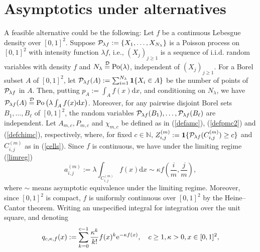 \documentclass[12pt]{article}
\def\N{\mathbb{N}}
\newcommand{\edist}{\stackrel{\mbox{\scriptsize${\cal D}$}}{=}}
\begin{document}





\section{Asymptotics under alternatives}\label{sec:alternativ}
A feasible alternative could be the following:
Let $f$ be a continuous Lebesgue density over $[0,1]^2$. Suppose ${\cal P}_{\lambda f} := \{X_1,\ldots, X_{N_\lambda}\}$
is a Poisson process on $[0,1]^2$ with intensity function $\lambda f$, i.e., $(X_j)_{j\ge 1}$ is a sequence of i.i.d. random variables with
density $f$ and $N_\lambda \edist \text{Po}(\lambda)$, independent of $(X_j)_{j \ge 1}$. For a Borel subset $A$ of $[0,1]^2$, let ${\cal P}_{\lambda f}(A) := \sum_{i=1}^{N_\lambda} {\bf 1}\{X_i \in A\}$
be the number of points of ${\cal P}_{\lambda f}$ in $A$. Then, putting $p_A := \int_A f(x) \mbox{d} x$, and conditioning on $N_\lambda$,
we have ${\cal P}_{\lambda f}(A) \edist \text{Po}\left(\lambda \int_A f(x) \mbox{d} x\right)$. Moreover, for any pairwise disjoint Borel sets $B_1,\ldots,B_\ell$ of $[0,1]^2$, the random variables ${\cal P}_{\lambda f}(B_1), \ldots, {\cal P}_{\lambda f}(B_\ell)$ are independent. Let $A_{m,c},P_{m,c} $ and $\chi_{m,c}$ be defined as in (\ref{defamc}), (\ref{defpmc2}) and (\ref{defchimc}), respectively, where, for fixed $c \in \N$, $Z^{(m)}_{i,j} := {\bf 1}\{{\cal P}_{\lambda f}(C^{(m)}_{i,j}) \ge c\}$
and $C^{(m)}_{i,j}$ as in (\ref{cells}). Since $f$ is continuous, we have under the limiting regime (\ref{limreg})
\begin{equation}\label{asygl}
a_{i,j}^{(m)}:=\lambda \int_{C^{(m)}_{i,j}} f(x) \mbox{d} x \sim \kappa f\left(\frac{i}{m},\frac{j}{m}\right),
\end{equation}
where $\sim$  means asymptotic equivalence under the limiting regime. Moreover, since $[0,1]^2$ is compact, $f$ is uniformly continuous over $[0,1]^2$ by the Heine--Cantor theorem. Writing an unspecified integral for integration over the unit square, and denoting
\begin{equation}\label{qckapf}
q_{c,\kappa,f}(x):=\sum_{k=0}^{c-1} \frac{\kappa^k}{k!} f(x)^k {\rm{e}}^{-\kappa f(x)},\quad c\ge1,\kappa>0,x\in[0,1]^2,
\end{equation}
\end{document}
